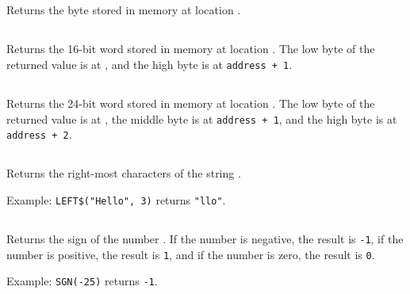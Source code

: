 \documentclass{report}
\begin{document}
    \subsection*{}

    Returns the byte stored in memory at location .

    \subsection*{}

    Returns the 16-bit word stored in memory at location .
    The low byte of the returned value is at , and the
    high byte is at \verb-address + 1-.

    \subsection*{}

    Returns the 24-bit word stored in memory at location .
    The low byte of the returned value is at ,
    the middle byte is at \verb-address + 1-, 
    and the high byte is at \verb-address + 2-.

    \subsection*{}

    Returns the right-most  characters of the string .

    Example: \verb+LEFT$("Hello", 3)+ returns \verb+"llo"+.
    
    \subsection*{}

    Returns the sign of the number .
    If the number is negative, the result is \verb+-1+,
    if the number is positive, the result is \verb+1+,
    and if the number is zero, the result is \verb+0+.

    Example: \verb+SGN(-25)+ returns \verb+-1+.

    \subsection*{}
\end{document}
